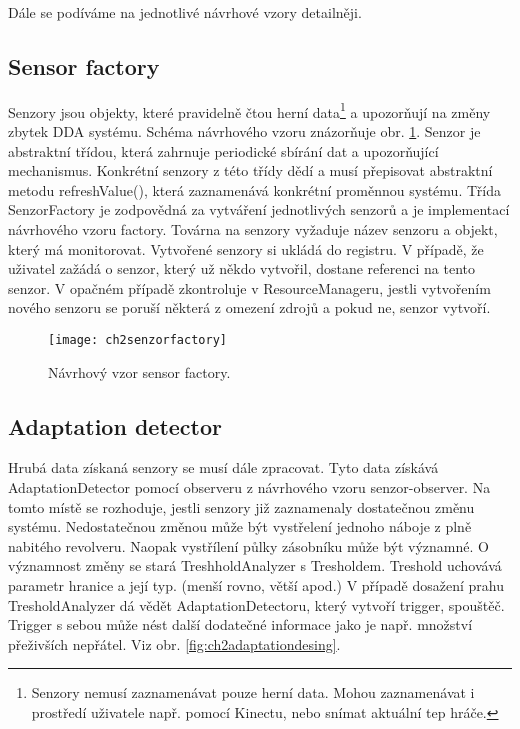 Dále se podíváme na jednotlivé návrhové vzory detailněji.

\subsection{Sensor factory}

Senzory jsou objekty, které pravidelně čtou herní data\footnote{Senzory nemusí zaznamenávat pouze herní data. Mohou zaznamenávat i prostředí uživatele např. pomocí Kinectu, nebo snímat aktuální tep hráče.} a upozorňují na změny zbytek DDA systému. Schéma návrhového vzoru znázorňuje obr. \ref{fig:ch2senzorfactory}. Senzor je abstraktní třídou, která zahrnuje periodické sbírání dat a upozorňující mechanismus. Konkrétní senzory z této třídy dědí a musí přepisovat abstraktní metodu refreshValue(), která zaznamenává konkrétní proměnnou systému. Třída SenzorFactory je zodpovědná za vytváření jednotlivých senzorů a je implementací návrhového vzoru factory. Továrna na senzory vyžaduje název senzoru a objekt, který má monitorovat. Vytvořené senzory si ukládá do registru. V případě, že uživatel zažádá o senzor, který už někdo vytvořil, dostane referenci na tento senzor. V opačném případě zkontroluje v ResourceManageru, jestli vytvořením nového senzoru se poruší některá z omezení zdrojů a pokud ne, senzor vytvoří.

\begin{figure}
  \centering
  \texttt{[image: ch2senzorfactory]}
	\caption{Návrhový vzor sensor factory. \cite{SwPatterns} }
	\label{fig:ch2senzorfactory}
\end{figure}

\subsection{Adaptation detector}

Hrubá data získaná senzory se musí dále zpracovat. Tyto data získává AdaptationDetector pomocí observeru z návrhového vzoru senzor-observer. Na tomto místě se rozhoduje, jestli senzory již zaznamenaly dostatečnou změnu systému. Nedostatečnou změnou může být vystřelení jednoho náboje z plně nabitého revolveru. Naopak vystřílení půlky zásobníku může být významné. O významnost změny se stará TreshholdAnalyzer s Tresholdem. Treshold uchovává parametr hranice a její typ. (menší rovno, větší apod.) V případě dosažení prahu TresholdAnalyzer dá vědět AdaptationDetectoru, který vytvoří trigger, spouštěč. Trigger s sebou může nést další dodatečné informace jako je např. množství přeživších nepřátel. Viz obr. \ref{fig:ch2adaptationdesing}.

